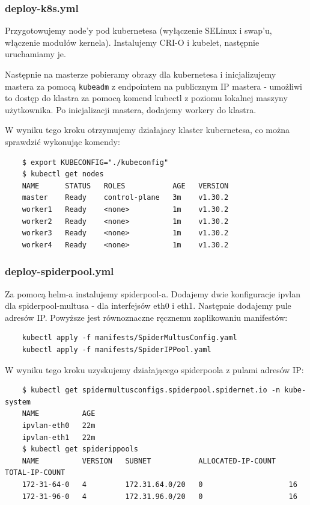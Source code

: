 \documentclass[onecolumn,12pt]{article}
\begin{document}
\subsubsection{deploy-k8s.yml}
Przygotowujemy node'y pod kubernetesa (wyłączenie SELinux i swap'u, włączenie modułów kernela).
Instalujemy CRI-O i kubelet, następnie uruchamiamy je.

Następnie na masterze pobieramy obrazy dla kubernetesa i inicjalizujemy mastera za pomocą \texttt{kubeadm} z endpointem na publicznym IP mastera - umożliwi to dostęp do klastra za pomocą komend kubectl z poziomu lokalnej maszyny użytkownika.
Po inicjalizacji mastera, dodajemy workery do klastra.

W wyniku tego kroku otrzymujemy działajacy klaster kubernetesa, co można sprawdzić wykonując komendy:
\begin{verbatim}
    $ export KUBECONFIG="./kubeconfig"
    $ kubectl get nodes
    NAME      STATUS   ROLES           AGE   VERSION
    master    Ready    control-plane   3m    v1.30.2
    worker1   Ready    <none>          1m    v1.30.2
    worker2   Ready    <none>          1m    v1.30.2
    worker3   Ready    <none>          1m    v1.30.2
    worker4   Ready    <none>          1m    v1.30.2
\end{verbatim}

\subsubsection{deploy-spiderpool.yml}
Za pomocą helm-a instalujemy spiderpool-a.
Dodajemy dwie konfiguracje ipvlan dla spiderpool-multusa - dla interfejsów eth0 i eth1.
Następnie dodajemy pule adresów IP.
Powyższe jest równoznaczne ręcznemu zaplikowaniu manifestów:
\begin{verbatim}
    kubectl apply -f manifests/SpiderMultusConfig.yaml
    kubectl apply -f manifests/SpiderIPPool.yaml
\end{verbatim}

W wyniku tego kroku uzyskujemy działającego spiderpoola z pulami adresów IP:
\begin{verbatim}
    $ kubectl get spidermultusconfigs.spiderpool.spidernet.io -n kube-system
    NAME          AGE
    ipvlan-eth0   22m
    ipvlan-eth1   22m
    $ kubectl get spiderippools
    NAME          VERSION   SUBNET           ALLOCATED-IP-COUNT   TOTAL-IP-COUNT
    172-31-64-0   4         172.31.64.0/20   0                    16
    172-31-96-0   4         172.31.96.0/20   0                    16
\end{verbatim}
\end{document}
